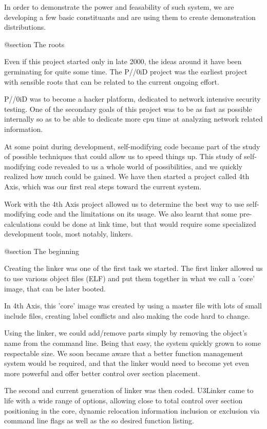 In order to demonstrate the power and feasability of such system, we are
developing a few basic constituants and are using them to create demonstration
distributions.

@section The roots

Even if this project started only in late 2000, the ideas around it have been
germinating for quite some time.  The P/\R/\N0iD project was the earliest
project with sensible roots that can be related to the current ongoing effort.

P/\R/\N0iD was to become a hacker platform, dedicated to network intensive
security testing.  One of the secondary goals of this project was to be as fast
as possible internally so as to be able to dedicate more cpu time at analyzing
network related information.

At some point during development, self-modifying code became part of the study
of possible techniques that could allow us to speed things up.  This study of
self-modifying code revealed to us a whole world of possibilities, and we
quickly realized how much could be gained. We have then started a project
called 4th Axis, which was our first real steps toward the current system.

Work with the 4th Axis project allowed us to determine the best way to use
self-modifying code and the limitations on its usage.  We also learnt that
some pre-calculations could be done at link time, but that would require
some specialized development tools, most notably, linkers.

@section The beginning

Creating the linker was one of the first task we started.  The first linker
allowed us to use various object files (ELF) and put them together in what we
call a 'core' image, that can be later booted.

In 4th Axis, this 'core' image was created by using a master file with lots of
small include files, creating label conflicts and also making the code hard
to change.

Using the linker, we could add/remove parts simply by removing the object's
name from the command line.  Being that easy, the system quickly grown to some
respectable size.  We soon became aware that a better function management
system would be required, and that the linker would need to become yet even
more powerful and offer better control over section placement.

The second and current generation of linker was then coded. U3Linker came to
life with a wide range of options, allowing close to total control over section
positioning in the core, dynamic relocation information inclusion or exclusion
via command line flags as well as the so desired function listing.

